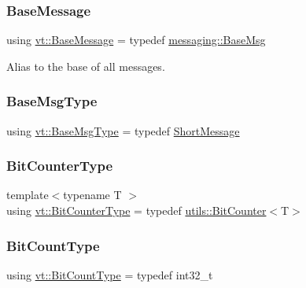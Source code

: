 \subsubsection{\texorpdfstring{Base\+Message}{BaseMessage}}
{\footnotesize\ttfamily using \hyperlink{namespacevt_ac34f95a5e2b8109b55bfba52b074443d}{vt\+::\+Base\+Message} = typedef \hyperlink{structvt_1_1messaging_1_1_base_msg}{messaging\+::\+Base\+Msg}}



Alias to the base of all messages. 

\mbox{\label{namespacevt_a44d0d4e144748f2b19a1cfd962f50338}} 
\subsubsection{\texorpdfstring{Base\+Msg\+Type}{BaseMsgType}}
{\footnotesize\ttfamily using \hyperlink{namespacevt_a44d0d4e144748f2b19a1cfd962f50338}{vt\+::\+Base\+Msg\+Type} = typedef \hyperlink{namespacevt_a1125ac1da6c0bbf141e0ea0739d7602d}{Short\+Message}}

\mbox{\label{namespacevt_a34b3eb2eea8db3cf4ae27ced35b19b46}} 
\subsubsection{\texorpdfstring{Bit\+Counter\+Type}{BitCounterType}}
{\footnotesize\ttfamily template$<$typename T $>$ \\
using \hyperlink{namespacevt_a34b3eb2eea8db3cf4ae27ced35b19b46}{vt\+::\+Bit\+Counter\+Type} = typedef \hyperlink{structvt_1_1utils_1_1_bit_counter}{utils\+::\+Bit\+Counter}$<$T$>$}

\mbox{\label{namespacevt_acaf7da00eb37dfb0c3479a6a982c30ef}} 
\subsubsection{\texorpdfstring{Bit\+Count\+Type}{BitCountType}}
{\footnotesize\ttfamily using \hyperlink{namespacevt_acaf7da00eb37dfb0c3479a6a982c30ef}{vt\+::\+Bit\+Count\+Type} = typedef int32\+\_\+t}




